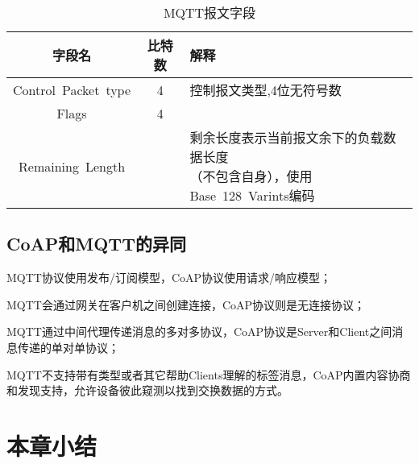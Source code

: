 \begin{table}[h!]
\caption{MQTT报文字段}
\begin{tabular}{ccl}
\toprule
字段名 & 比特数 & 解释\\
\midrule
Control Packet type	&4&控制报文类型,4位无符号数\\
Flags	&4&	\\
Remaining Length&&\makecell[c]{剩余长度表示当前报文余下的负载数据长度\\（不包含自身），使用Base 128 Varints编码}\\
\bottomrule
\end{tabular}
\label{mqtt字段}
\end{table}

\subsection{CoAP和MQTT的异同}


  MQTT协议使用发布/订阅模型，CoAP协议使用请求/响应模型；

  MQTT会通过网关在客户机之间创建连接，CoAP协议则是无连接协议；

  MQTT通过中间代理传递消息的多对多协议，CoAP协议是Server和Client之间消息传递的单对单协议；
  
  MQTT不支持带有类型或者其它帮助Clients理解的标签消息，CoAP内置内容协商和发现支持，允许设备彼此窥测以找到交换数据的方式。


\section{本章小结}